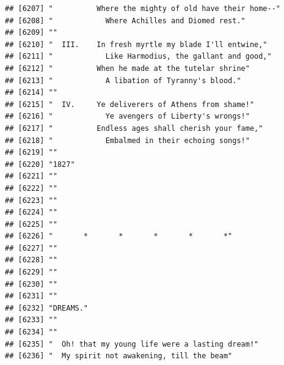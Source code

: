 \documentclass{article}\usepackage[]{graphicx}\usepackage[]{color}
\makeatletter
\newenvironment{kframe}{%
 \def\at@end@of@kframe{}%
 \ifinner\ifhmode%
  \def\at@end@of@kframe{\end{minipage}}%
  \begin{minipage}{\columnwidth}%
 \fi\fi%
 \def\FrameCommand##1{\hskip\@totalleftmargin \hskip-\fboxsep
 \colorbox{shadecolor}{##1}\hskip-\fboxsep
     \hskip-\linewidth \hskip-\@totalleftmargin \hskip\columnwidth}%
 \MakeFramed {\advance\hsize-\width
   \@totalleftmargin\z@ \linewidth\hsize
   \@setminipage}}%
 {\par\unskip\endMakeFramed%
 \at@end@of@kframe}
\newenvironment{knitrout}{}{} %
\makeatother
\begin{document}
\begin{knitrout}
\begin{kframe}
\begin{verbatim}
## [6207] "          Where the mighty of old have their home--"                         
## [6208] "            Where Achilles and Diomed rest."                                 
## [6209] ""                                                                            
## [6210] "  III.    In fresh myrtle my blade I'll entwine,"                            
## [6211] "            Like Harmodius, the gallant and good,"                           
## [6212] "          When he made at the tutelar shrine"                                
## [6213] "            A libation of Tyranny's blood."                                  
## [6214] ""                                                                            
## [6215] "  IV.     Ye deliverers of Athens from shame!"                               
## [6216] "            Ye avengers of Liberty's wrongs!"                                
## [6217] "          Endless ages shall cherish your fame,"                             
## [6218] "            Embalmed in their echoing songs!"                                
## [6219] ""                                                                            
## [6220] "1827"                                                                        
## [6221] ""                                                                            
## [6222] ""                                                                            
## [6223] ""                                                                            
## [6224] ""                                                                            
## [6225] ""                                                                            
## [6226] "       *       *       *       *       *"                                    
## [6227] ""                                                                            
## [6228] ""                                                                            
## [6229] ""                                                                            
## [6230] ""                                                                            
## [6231] ""                                                                            
## [6232] "DREAMS."                                                                     
## [6233] ""                                                                            
## [6234] ""                                                                            
## [6235] "  Oh! that my young life were a lasting dream!"                              
## [6236] "  My spirit not awakening, till the beam"                                    

\end{verbatim}
\end{kframe}
\end{knitrout}
\end{document}
